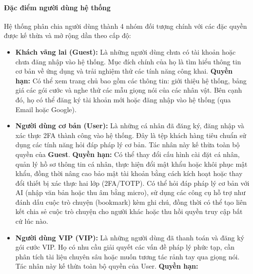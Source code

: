 \paragraph{Đặc điểm người dùng hệ thống}

Hệ thống phân chia người dùng
thành 4 nhóm đối tượng chính
với các đặc quyền được kế thừa
và mở rộng dần theo cấp độ:

\begin{itemize}

\item \textbf{Khách vãng lai (Guest):}
Là những người dùng chưa có tài khoản
hoặc chưa đăng nhập vào hệ thống.
Mục đích chính của họ
là tìm hiểu thông tin cơ bản về ứng dụng
và trải nghiệm thử các tính năng công khai.
\textbf{Quyền hạn:}
Có thể xem trang chủ bao gồm các thông tin:
giới thiệu hệ thống, bảng giá các gói cước
và nghe thử các mẫu giọng nói của các nhân vật.
Bên cạnh đó, họ có thể đăng ký tài khoản mới
hoặc đăng nhập vào hệ thống (qua Email hoặc Google).




\item \textbf{Người dùng cơ bản (User):}
Là những cá nhân đã đăng ký, đăng nhập
và xác thực 2FA
thành công vào hệ thống.
Đây là tệp khách hàng tiêu chuẩn
sử dụng các tính năng
hỏi đáp pháp lý cơ bản.
Tác nhân này kế thừa toàn bộ quyền của \textbf{Guest}.
\textbf{Quyền hạn:}
Có thể
thay đổi cấu hình cài đặt cá nhân,
quản lý hồ sơ thông tin cá nhân,
thực hiện đổi mật khẩu hoặc khôi phục mật khẩu,
đồng thời nâng cao bảo mật tài khoản bằng cách kích hoạt hoặc thay đổi thiết bị xác thực hai lớp (2FA/TOTP).
Có thể hỏi đáp pháp lý cơ bản với AI (nhập văn bản hoặc thu âm bằng micro),
sử dụng các công cụ hỗ trợ như đánh dấu cuộc trò chuyện (bookmark) kèm ghi chú, đồng thời có thể tạo liên kết chia sẻ cuộc trò chuyện cho người khác hoặc thu hồi quyền truy cập bất cứ lúc nào.








\item \textbf{Người dùng VIP (VIP):}
Là những người dùng đã thanh toán
và đăng ký gói cước VIP.
Họ có nhu cầu giải quyết
các vấn đề pháp lý phức tạp,
cần phân tích tài liệu chuyên sâu
hoặc muốn tương tác rảnh tay qua giọng nói.
Tác nhân này kế thừa toàn bộ quyền của User.
\textbf{Quyền hạn:}



\end{itemize}
